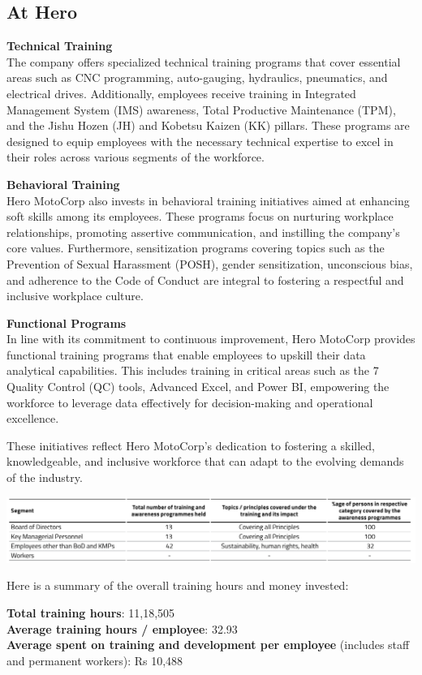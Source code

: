 \subsection{At Hero}

\textbf{Technical Training}\\
The company offers specialized technical training programs that cover essential areas such as CNC programming, auto-gauging, hydraulics, pneumatics, and electrical drives. Additionally, employees receive training in Integrated Management System (IMS) awareness, Total Productive Maintenance (TPM), and the Jishu Hozen (JH) and Kobetsu Kaizen (KK) pillars. These programs are designed to equip employees with the necessary technical expertise to excel in their roles across various segments of the workforce.

\textbf{Behavioral Training}\\
Hero MotoCorp also invests in behavioral training initiatives aimed at enhancing soft skills among its employees. These programs focus on nurturing workplace relationships, promoting assertive communication, and instilling the company's core values. Furthermore, sensitization programs covering topics such as the Prevention of Sexual Harassment (POSH), gender sensitization, unconscious bias, and adherence to the Code of Conduct are integral to fostering a respectful and inclusive workplace culture.

\textbf{Functional Programs}\\
In line with its commitment to continuous improvement, Hero MotoCorp provides functional training programs that enable employees to upskill their data analytical capabilities. This includes training in critical areas such as the 7 Quality Control (QC) tools, Advanced Excel, and Power BI, empowering the workforce to leverage data effectively for decision-making and operational excellence.

These initiatives reflect Hero MotoCorp's dedication to fostering a skilled, knowledgeable, and inclusive workforce that can adapt to the evolving demands of the industry.

\includegraphics[width=\linewidth]{psycho_images/Hero_Training.png}

Here is a summary of the overall training hours and money invested:

\textbf{Total training hours}: 11,18,505 \\
\textbf{Average training hours / employee}: 32.93 \\
\textbf{Average spent on training and development per employee} (includes staff and permanent workers): Rs 10,488 \\

